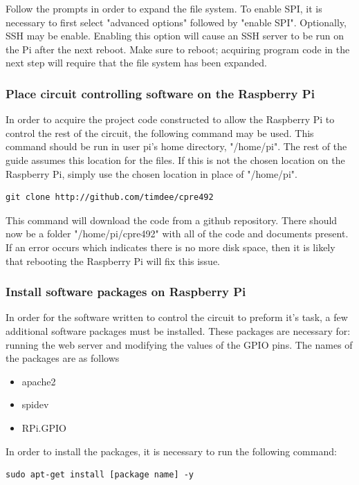 \documentclass{article}	%
\begin{document}
\begin{multicols}{2}
Follow the prompts in order to expand the file system.
To enable SPI, it is necessary to first
select "advanced options" followed by "enable SPI".
Optionally, SSH may be enable.
Enabling this option will cause an SSH server
to be run on the Pi after the next reboot. 
Make sure to reboot;
acquiring program code in the next step will require
that the file system has been expanded.

\subsubsection{Place circuit controlling software on the Raspberry Pi}
In order to acquire the project code constructed to 
allow the Raspberry Pi to control the rest of the circuit,
the following command may be used.
This command should be run in user pi's home directory, "/home/pi".
The rest of the guide assumes this location for the files.
If this is not the chosen location on the
Raspberry Pi,
simply use the chosen location in place of "/home/pi".

\begin{lstlisting}
git clone http://github.com/timdee/cpre492
\end{lstlisting}

This command will download the code from
a github repository.
There should now be a folder "/home/pi/cpre492" with
all of the code and documents present.
If an error occurs which indicates there is no more disk space,
then it is likely that rebooting the Raspberry Pi will fix this issue.

\subsubsection{Install software packages on Raspberry Pi}
In order for the software written to
control the circuit to preform it's task,
a few additional software packages must be installed.
These packages are necessary for:
running the web server
and modifying the values of the GPIO pins.
The names of the packages are as follows

\begin{itemize}
\item apache2
\item spidev
\item RPi.GPIO
\end{itemize}

In order to install the packages,
it is necessary to run the following command:

\begin{lstlisting}
sudo apt-get install [package name] -y
\end{lstlisting}


\end{multicols}
\end{document}
